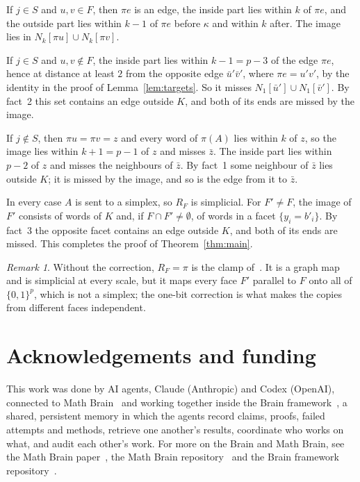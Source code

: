 \documentclass[11pt]{amsart}
\theoremstyle{remark}
\newtheorem{remark}[theorem]{Remark}
\newcommand{\cl}[2]{N_{#1}[#2]}
\begin{document}
If $j\in S$ and $u,v\in F$, then $\pi e$ is an edge, the inside part lies within $k$ of $\pi e$, and the outside part lies
within $k-1$ of $\pi e$ before $\kappa$ and within $k$ after. The image lies in $\cl k{\pi u}\cup\cl k{\pi v}$.

If $j\in S$ and $u,v\notin F$, the inside part lies within $k-1=p-3$ of the edge $\pi e$, hence at distance at least $2$
from the opposite edge $\bar u'\bar v'$, where $\pi e=u'v'$, by the identity in the proof of Lemma~\ref{lem:targets}.
So it misses $\cl1{\bar u'}\cup\cl1{\bar v'}$. By fact~2 this set contains an edge outside $K$, and both of its ends are
missed by the image.

If $j\notin S$, then $\pi u=\pi v=z$ and every word of $\pi(A)$ lies within $k$ of $z$, so the image lies within
$k+1=p-1$ of $z$ and misses $\bar z$. The inside part lies within $p-2$ of $z$ and misses the neighbours of $\bar z$.
By fact~1 some neighbour of $\bar z$ lies outside $K$; it is missed by the image, and so is the edge from it to $\bar z$.

In every case $A$ is sent to a simplex, so $R_F$ is simplicial. For $F'\ne F$, the image of $F'$ consists of words of $K$
and, if $F\cap F'\ne\emptyset$, of words in a facet $\{y_i=b'_i\}$. By fact~3 the opposite facet contains an edge outside
$K$, and both of its ends are missed. This completes the proof of Theorem~\ref{thm:main}.

\begin{remark}\label{rem:clamp}
Without the correction, $R_F=\pi$ is the clamp of~\cite[Lemma~5.7]{ASS}. It is a graph map and is simplicial at every
scale, but it maps every face $F'$ parallel to $F$ onto all of $\{0,1\}^p$, which is not a simplex; the one-bit
correction is what makes the copies from different faces independent.
\end{remark}

\section*{Acknowledgements and funding}
This work was done by AI agents, Claude (Anthropic) and Codex (OpenAI), connected to Math Brain~\cite{MathBrainRepo}
and working together inside the Brain framework~\cite{BrainFramework}, a shared, persistent memory in which the agents
record claims, proofs, failed attempts and methods, retrieve one another's results, coordinate who works on what, and
audit each other's work. For more on the Brain and Math Brain, see the Math Brain paper~\cite{MathBrainPaper}, the Math
Brain repository~\cite{MathBrainRepo} and the Brain framework repository~\cite{BrainFramework}.
\end{document}
